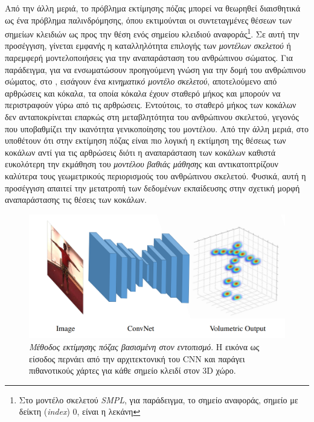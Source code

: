 Από την άλλη μεριά, το πρόβλημα εκτίμησης πόζας μπορεί να θεωρηθεί διαισθητικά ως ένα πρόβλημα παλινδρόμησης,  όπου εκτιμούνται οι συντεταγμένες θέσεων των σημείων κλειδιών ως προς την θέση ενός σημείου κλειδιού αναφοράς\footnote{Στο μοντέλο σκελετού \textsl{SMPL}, για παράδειγμα, το σημείο αναφοράς, σημείο με δείκτη (\textsl{index}) 0, είναι η λεκάνη}. Σε αυτή την προσέγγιση, γίνεται εμφανής η καταλληλότητα επιλογής των \textsl{μοντέλων σκελετού} ή παρεμφερή μοντελοποιήσεις για την αναπαράσταση του ανθρώπινου σώματος. Για παράδειγμα, για να ενσωματώσουν προηγούμενη γνώση για την δομή του ανθρώπινου σώματος, στο \cite{kinematic_pose_regression_paper}, εισάγουν ένα \textsl{κινηματικό μοντέλο σκελετού}, αποτελούμενο από αρθρώσεις και κόκαλα, τα οποία κόκαλα έχουν σταθερό μήκος και μπορούν να περιστραφούν γύρω από τις αρθρώσεις. Εντούτοις, το σταθερό μήκος των κοκάλων δεν ανταποκρίνεται επαρκώς στη μεταβλητότητα του ανθρώπινου σκελετού, γεγονός που υποβαθμίζει την ικανότητα γενικοποίησης του μοντέλου. Από την άλλη μεριά, στο \cite{composition_human_pose_regression} υποθέτουν ότι στην εκτίμηση πόζας είναι πιο λογική η εκτίμηση της θέσεως των κοκάλων αντί για τις αρθρώσεις διότι η αναπαράσταση των κοκάλων καθιστά ευκολότερη την εκμάθηση του \textsl{μοντέλου βαθιάς μάθησης} και αντικατοπτρίζουν καλύτερα τους γεωμετρικούς περιορισμούς του ανθρώπινου σκελετού. Φυσικά, αυτή η προσέγγιση απαιτεί την μετατροπή των δεδομένων εκπαίδευσης στην σχετική μορφή αναπαράστασης τις θέσεις των κοκάλων. 

\begin{figure}[h]
	\centering
	\includegraphics[scale=0.4]{images/chapter2/3d_pose_estimation/pavlakos_architecture.png}
	\caption[Μέθοδος εκτίμησης πόζας βασισμένη στον εντοπισμό]{\textsl{Μέθοδος εκτίμησης πόζας βασισμένη στον εντοπισμό}. Η εικόνα ως είσοδος περνάει από την αρχιτεκτονική του CNN και παράγει πιθανοτικούς χάρτες για κάθε σημείο κλειδί στον 3D χώρο.}
	\label{fig:pavlakos_architecture}
\end{figure}

